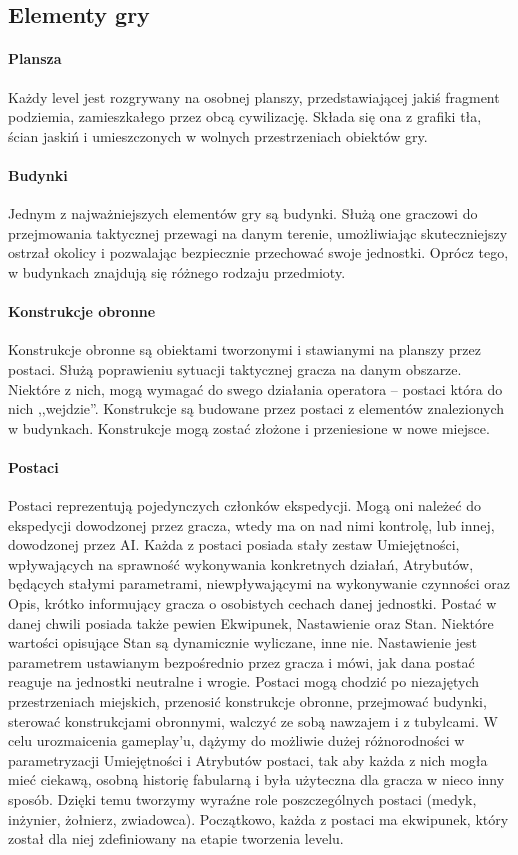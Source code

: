 \documentclass[licencjacka]{pracamgr}
\begin{document}
    \subsection{Elementy gry}
    \paragraph{Plansza}
      Każdy level jest rozgrywany na osobnej planszy, przedstawiającej jakiś fragment podziemia, zamieszkałego przez
      obcą cywilizację. Składa się ona z grafiki tła, ścian jaskiń i umieszczonych w wolnych przestrzeniach obiektów gry.
    \paragraph{Budynki}
      Jednym z najważniejszych elementów gry są budynki. Służą one graczowi do przejmowania taktycznej przewagi na danym
      terenie, umożliwiając skuteczniejszy ostrzał okolicy i pozwalając bezpiecznie przechować swoje jednostki. Oprócz tego,
      w budynkach znajdują się różnego rodzaju przedmioty.
    \paragraph{Konstrukcje obronne}
      Konstrukcje obronne są obiektami tworzonymi i stawianymi na planszy przez postaci. Służą poprawieniu sytuacji
      taktycznej gracza na danym obszarze. Niektóre z nich, mogą wymagać do swego działania operatora – postaci która
      do nich ,,wejdzie''. Konstrukcje są budowane przez postaci z elementów znalezionych w budynkach. Konstrukcje mogą
      zostać złożone i przeniesione w nowe miejsce.
    \paragraph{Postaci}
      Postaci reprezentują pojedynczych członków ekspedycji. Mogą oni należeć do ekspedycji dowodzonej przez gracza,
      wtedy ma on nad nimi kontrolę, lub innej, dowodzonej przez AI. Każda z postaci posiada stały zestaw Umiejętności,
      wpływających na sprawność wykonywania konkretnych działań, Atrybutów, będących stałymi parametrami, niewpływającymi
      na wykonywanie czynności oraz Opis, krótko informujący gracza o osobistych cechach danej jednostki. Postać w danej
      chwili posiada także pewien Ekwipunek, Nastawienie oraz Stan. Niektóre wartości opisujące Stan są dynamicznie wyliczane,
      inne nie. Nastawienie jest parametrem ustawianym bezpośrednio przez gracza i mówi, jak dana postać reaguje na jednostki
      neutralne i wrogie. Postaci mogą chodzić po niezajętych przestrzeniach miejskich, przenosić konstrukcje obronne,
      przejmować budynki, sterować konstrukcjami obronnymi, walczyć ze sobą nawzajem i z tubylcami. W celu urozmaicenia
      gameplay'u, dążymy do możliwie dużej różnorodności w parametryzacji Umiejętności i Atrybutów postaci, tak aby każda
      z nich mogła mieć ciekawą, osobną historię fabularną i była użyteczna dla gracza w nieco inny sposób. Dzięki temu
      tworzymy wyraźne role poszczególnych postaci (medyk, inżynier, żołnierz, zwiadowca). Początkowo, każda z postaci
      ma ekwipunek, który został dla niej zdefiniowany na etapie tworzenia levelu.
\end{document}
